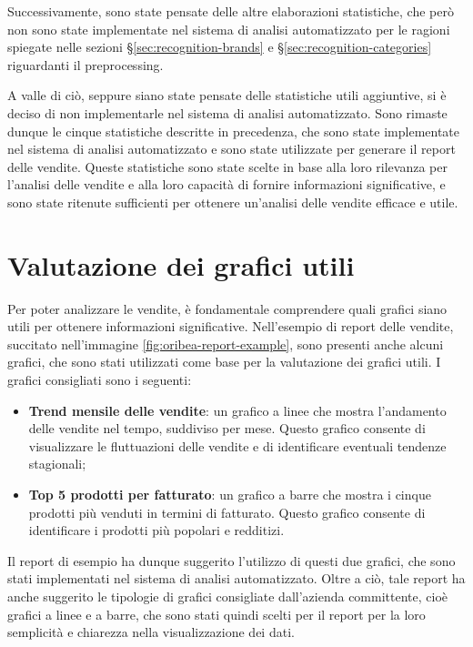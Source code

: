 Successivamente, sono state pensate delle altre elaborazioni statistiche, che però non sono state implementate nel sistema di analisi automatizzato per le ragioni spiegate nelle sezioni \S\ref{sec:recognition-brands} e \S\ref{sec:recognition-categories} riguardanti il \gls{preprocessing}.

A valle di ciò, seppure siano state pensate delle statistiche utili aggiuntive, si è deciso di non implementarle nel sistema di analisi automatizzato. Sono rimaste dunque le cinque statistiche descritte in precedenza, che sono state implementate nel sistema di analisi automatizzato e sono state utilizzate per generare il report delle vendite. Queste statistiche sono state scelte in base alla loro rilevanza per l'analisi delle vendite e alla loro capacità di fornire informazioni significative, e sono state ritenute sufficienti per ottenere un'analisi delle vendite efficace e utile.



\section{Valutazione dei grafici utili}

Per poter analizzare le vendite, è fondamentale comprendere quali grafici siano utili per ottenere informazioni significative. Nell'esempio di report delle vendite, succitato nell'immagine \ref{fig:oribea-report-example}, sono presenti anche alcuni grafici, che sono stati utilizzati come base per la valutazione dei grafici utili.
I grafici consigliati sono i seguenti:
\begin{itemize}
    \item \textbf{Trend mensile delle vendite}: un grafico a linee che mostra l'andamento delle vendite nel tempo, suddiviso per mese. Questo grafico consente di visualizzare le fluttuazioni delle vendite e di identificare eventuali tendenze stagionali;
    \item \textbf{Top 5 prodotti per fatturato}: un grafico a barre che mostra i cinque prodotti più venduti in termini di fatturato. Questo grafico consente di identificare i prodotti più popolari e redditizi.
\end{itemize}

Il report di esempio ha dunque suggerito l'utilizzo di questi due grafici, che sono stati implementati nel sistema di analisi automatizzato. Oltre a ciò, tale report ha anche suggerito le tipologie di grafici consigliate dall'azienda committente, cioè grafici a linee e a barre, che sono stati quindi scelti per il report per la loro semplicità e chiarezza nella visualizzazione dei dati.

